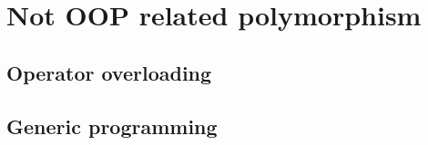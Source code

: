\documentclass{KodeBook}
\begin{document}
%
%
%
%
%
%
%
%
%
%
%
%
%
%
%
%

\section{Not OOP related polymorphism}

\subsection{Operator overloading}

\subsection{Generic programming}

\ifx\wholebook\relax\else
% 
% 
	
\end{document}
